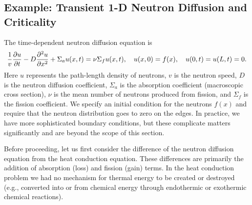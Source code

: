 \subsection{Example: Transient 1-D Neutron Diffusion and Criticality}

The time-dependent neutron diffusion equation is
\begin{align}
  \frac{1}{v} \frac{ \partial {u} }{ \partial {t} } - D \frac{ \partial^2 {u} }{ \partial {x}^2 } + \Sigma_a u(x,t) = \nu \Sigma_f u(x,t) , \quad u(x,0) = f(x), \quad u(0,t) = u(L,t) = 0 .
\end{align}
Here $u$ represents the path-length density of neutrons, $v$ is the neutron speed, $D$ is the neutron diffusion coefficient, $\Sigma_a$ is the absorption coefficient (macroscopic cross section), $\nu$ is the mean number of neutrons produced from fission, and $\Sigma_f$ is the fission coefficient. We specify an initial condition for the neutrons $f(x)$ and require that the neutron distribution goes to zero on the edges. In practice, we have more sophisticated boundary conditions, but these complicate matters significantly and are beyond the scope of this section.

Before proceeding, let us first consider the difference of the neutron diffusion equation from the heat conduction equation. These differences are primarily the addition of absorption (loss) and fission (gain) terms. In the heat conduction problem we had no mechanism for thermal energy to be created or destroyed (e.g., converted into or from chemical energy through endothermic or exothermic chemical reactions).

